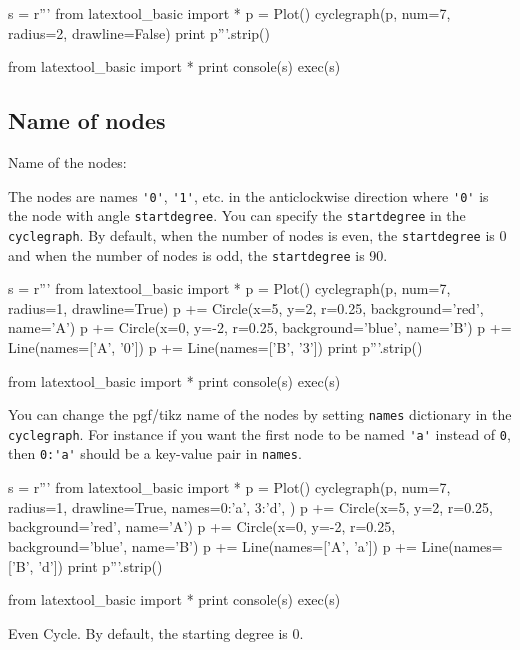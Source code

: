 \begin{python}
s = r'''
from latextool_basic import *
p = Plot()
cyclegraph(p, num=7, radius=2, drawline=False)
print p'''.strip()

from latextool_basic import *
print console(s)
exec(s)
\end{python}




\newpage
\subsection{Name of nodes}

Name of the nodes:

The nodes are names
\verb!'0'!,
\verb!'1'!, etc. in the anticlockwise direction where \verb!'0'!
is the node with angle \verb!startdegree!.
You can specify the \verb!startdegree! in the \verb!cyclegraph!.
By default, when the number of nodes is even, the \verb!startdegree! is 0
and when the number of nodes is odd, the \verb!startdegree! is 90.

\begin{python}
s = r'''
from latextool_basic import *
p = Plot()
cyclegraph(p, num=7, radius=1, drawline=True)
p += Circle(x=5, y=2, r=0.25, background='red', name='A')
p += Circle(x=0, y=-2, r=0.25, background='blue', name='B')
p += Line(names=['A', '0'])
p += Line(names=['B', '3'])
print p'''.strip()

from latextool_basic import *
print console(s)
exec(s)
\end{python}


You can change the pgf/tikz name of the nodes by
setting \verb!names! dictionary in the \verb!cyclegraph!.
For instance if you want the first node to be named \verb!'a'!
instead of \verb!0!, then \verb!0:'a'! should be a key-value pair
in \verb!names!.

\begin{python}
s = r'''
from latextool_basic import *
p = Plot()
cyclegraph(p, num=7, radius=1, drawline=True,
           names={0:'a',
                  3:'d',
                  })
p += Circle(x=5, y=2, r=0.25, background='red', name='A')
p += Circle(x=0, y=-2, r=0.25, background='blue', name='B')
p += Line(names=['A', 'a'])
p += Line(names=['B', 'd'])
print p'''.strip()

from latextool_basic import *
print console(s)
exec(s)
\end{python}


\newpage
Even Cycle.
By default, the starting degree is 0.

